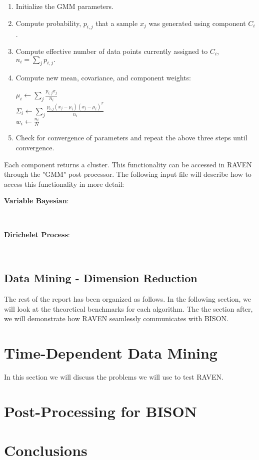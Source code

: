 \documentclass[11pt]{article}
\begin{document}
\begin{enumerate}

\item Initialize the GMM parameters.

\item Compute probability, $p_{i,j}$ that a sample $x_j$ was generated using component $C_i$.

\item Compute effective number of data points currently assigned to $C_i$, $n_i = \sum_j p_{i,j}.$

\item Compute new mean, covariance, and component weights:

\begin{center}

$\mu_i \leftarrow \sum_{j} \frac{p_{i, j} x_j}{n_i}$ \\

$\Sigma_i \leftarrow \sum_j \frac{p_{i, j}(x_j - \mu_i)(x_j - \mu_i)^T}{n_i}$ \\

$ w_i \leftarrow \frac{n_i}{N}$

\end{center}

\item Check for convergence of parameters and repeat the above three steps until convergence. 

\end{enumerate}   

Each component returns a cluster. This functionality can be accessed in RAVEN through the "GMM" post processor. The following input file will describe how to access this functionality in more detail: \\

\begin{large}
\textbf{Variable Bayesian}:
\end{large} \\

\begin{large}
\textbf{Dirichelet Process}:
\end{large} \\

\subsection{Data Mining - Dimension Reduction}

The rest of the report has been organized as follows. In the following section, we will look at the theoretical benchmarks for each algorithm. The the section after, we will demonstrate how RAVEN seamlessly communicates with BISON.  

\section{Time-Dependent Data Mining}

In this section we will discuss the problems we will use to test RAVEN. 

\section{Post-Processing for BISON}



\section{Conclusions}
\end{document}
